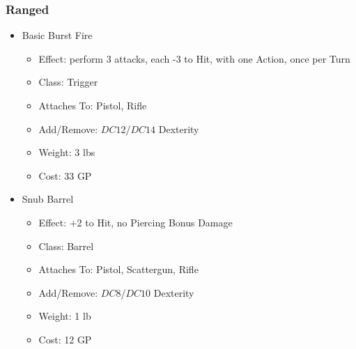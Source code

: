 \documentclass[12pt, landscape]{article}
\begin{document}
\begin{FlushLeft}
\begin{multicols}{2}
			\subsubsection{Ranged}
			\begin{itemize}
				\item Basic Burst Fire
				\begin{itemize}
					\item Effect: perform 3 attacks, each -3 to Hit, with one Action, once per Turn
					\item Class: Trigger
					\item Attaches To: Pistol, Rifle
					\item Add/Remove: $DC12$/$DC14$ Dexterity
					\item Weight: 3 lbs
					\item Cost: 33 GP
				\end{itemize}
				\item Snub Barrel
				\begin{itemize}
					\item Effect: +2 to Hit, no Piercing Bonus Damage  
					\item Class: Barrel
					\item Attaches To: Pistol, Scattergun, Rifle
					\item Add/Remove: $DC8$/$DC10$ Dexterity
					\item Weight: 1 lb
					\item Cost: 12 GP
				\end{itemize}
			\end{itemize}


\end{multicols}
\end{FlushLeft}
\end{document}
